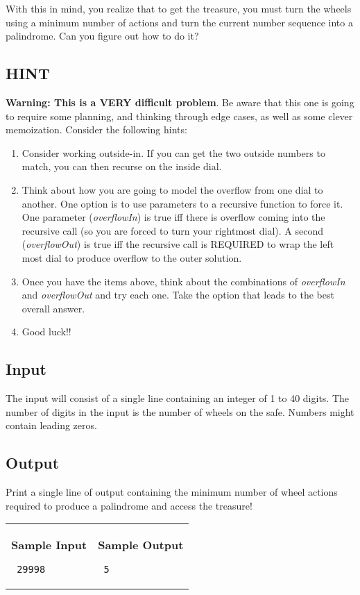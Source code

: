 \documentclass[11pt]{article}
\begin{document}
With this in mind, you realize that to get the treasure, you must turn the wheels using a minimum number of actions and turn the current number sequence into a palindrome. Can you figure out how to do it?

\subsection*{HINT}

\textbf{Warning: This is a VERY difficult problem}. Be aware that this one is going to require some planning, and thinking through edge cases, as well as some clever memoization. Consider the following hints:

\begin{enumerate}
	\item Consider working outside-in. If you can get the two outside numbers to match, you can then recurse on the inside dial.
	\item Think about how you are going to model the overflow from one dial to another. One option is to use parameters to a recursive function to force it. One parameter (\emph{overflowIn}) is true iff there is overflow coming into the recursive call (so you are forced to turn your rightmost dial). A second (\emph{overflowOut}) is true iff the recursive call is REQUIRED to wrap the left most dial to produce overflow to the outer solution.
	\item Once you have the items above, think about the combinations of \emph{overflowIn} and \emph{overflowOut} and try each one. Take the option that leads to the best overall answer.
	\item Good luck!! 
\end{enumerate}

\subsection*{Input}

The input will consist of a single line containing an integer of 1 to 40 digits. The number of digits in the input is the number of wheels on the safe. Numbers might contain leading zeros.

\subsection*{Output}

Print a single line of output containing the minimum number of wheel actions required to produce a palindrome and access the treasure!


\vspace{0.25in}\hspace{-0.3in}\begin{tabular}{ll}

\parbox{3in}{{\large\bf Sample Input}

\vspace{0.15in}

{\tt 
29998
}
}

&

\parbox{3in}{{\large\bf Sample Output}

\vspace{0.15in}

{\tt
5
}


}

\\
\end{tabular}
\end{document}
